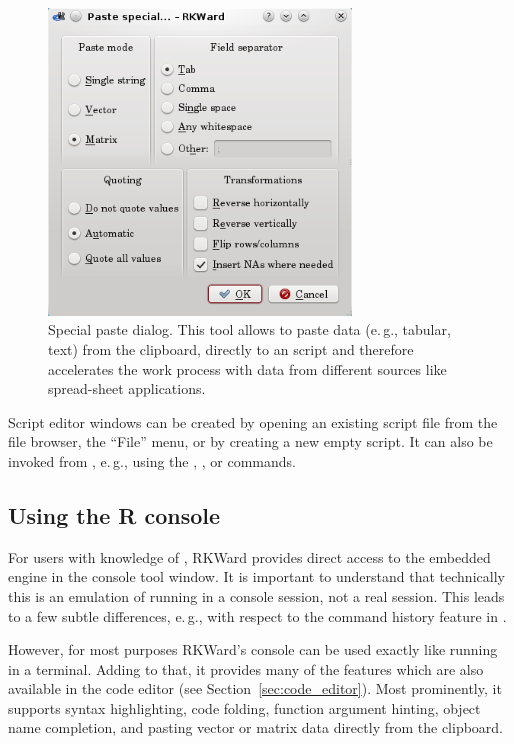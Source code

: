 \begin{figure}[htp]
 \centering
 \includegraphics[width=8.042cm,height=8.143cm]{../figures/special_paste.png}
 \caption{Special paste dialog. This tool allows to paste data (e.\,g., tabular, text) from the clipboard, directly to an 
  script and therefore accelerates the work process with data from different sources 
 like spread-sheet applications.
}
 \label{fig:special_paste}
\end{figure}

Script editor windows can be created by opening an existing
 script file from the file browser, the
``File'' menu, or by creating a new empty script. It can
also be invoked from , e.\,g., using the
, , or 
commands.

\subsection{Using the R console}
\label{sec:using_R_console}
For users with knowledge of , RKWard provides direct access to the
embedded  engine in the
 console tool window. It is important to understand that technically this is an
emulation of  running in a console
session, not a real  session. This leads to a few subtle
differences, e.\,g., with respect to the command history feature in
.

However, for most purposes RKWard's  console can be used exactly
like  running in a terminal. Adding to that, it provides many of the
features which are also available in the code editor (see Section~\ref{sec:code_editor}).
Most prominently, it supports syntax highlighting, code
folding, function argument hinting, object name completion, and pasting
vector or matrix data directly from the clipboard.

